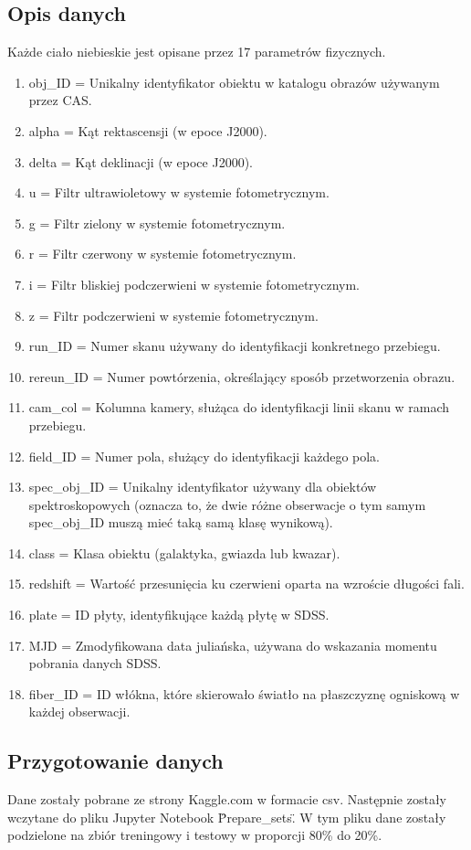 \documentclass{article}
\begin{document}
\subsection{Opis danych}
Każde ciało niebieskie jest opisane przez 17 parametrów fizycznych.
\begin{enumerate}
    \item obj\_ID = Unikalny identyfikator obiektu w katalogu obrazów używanym przez CAS.
    \item alpha = Kąt rektascensji (w epoce J2000).
    \item delta = Kąt deklinacji (w epoce J2000).
    \item u = Filtr ultrawioletowy w systemie fotometrycznym.
    \item g = Filtr zielony w systemie fotometrycznym.
    \item r = Filtr czerwony w systemie fotometrycznym.
    \item i = Filtr bliskiej podczerwieni w systemie fotometrycznym.
    \item z = Filtr podczerwieni w systemie fotometrycznym.
    \item run\_ID = Numer skanu używany do identyfikacji konkretnego przebiegu.
    \item rereun\_ID = Numer powtórzenia, określający sposób przetworzenia obrazu.
    \item cam\_col = Kolumna kamery, służąca do identyfikacji linii skanu w ramach przebiegu.
    \item field\_ID = Numer pola, służący do identyfikacji każdego pola.
    \item spec\_obj\_ID = Unikalny identyfikator używany dla obiektów spektroskopowych (oznacza to, że dwie różne obserwacje o tym samym spec\_obj\_ID muszą mieć taką samą klasę wynikową).
    \item class = Klasa obiektu (galaktyka, gwiazda lub kwazar).
    \item redshift = Wartość przesunięcia ku czerwieni oparta na wzroście długości fali.
    \item plate = ID płyty, identyfikujące każdą płytę w SDSS.
    \item MJD = Zmodyfikowana data juliańska, używana do wskazania momentu pobrania danych SDSS.
    \item fiber\_ID = ID włókna, które skierowało światło na płaszczyznę ogniskową w każdej obserwacji.
    \end{enumerate}
\subsection{Przygotowanie danych}
Dane zostały pobrane ze strony Kaggle.com w formacie csv. Następnie zostały wczytane do pliku Jupyter Notebook \"
Prepare\_sets\". W tym pliku dane zostały podzielone na zbiór treningowy i testowy w proporcji 80\% do 20\%.
\end{document}
